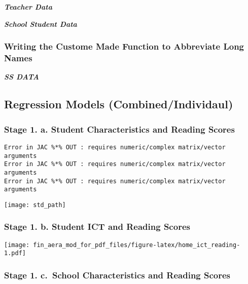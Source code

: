 \documentclass[
]{article}
\begin{document}
\textbf{\emph{Teacher Data}}

\textbf{\emph{School Student Data}}

\hypertarget{writing-the-custome-made-function-to-abbreviate-long-names}{%
\subsubsection{Writing the Custome Made Function to Abbreviate Long
Names}\label{writing-the-custome-made-function-to-abbreviate-long-names}}

\textbf{\emph{SS DATA}}

\hypertarget{regression-models-combinedindividaul}{%
\subsection{Regression Models
(Combined/Individaul)}\label{regression-models-combinedindividaul}}

\hypertarget{stage-1.-a.-student-characteristics-and-reading-scores}{%
\subsubsection{Stage 1. a. Student Characteristics and Reading
Scores}\label{stage-1.-a.-student-characteristics-and-reading-scores}}

\begin{verbatim}
Error in JAC %*% OUT : requires numeric/complex matrix/vector arguments
Error in JAC %*% OUT : requires numeric/complex matrix/vector arguments
Error in JAC %*% OUT : requires numeric/complex matrix/vector arguments
\end{verbatim}

\texttt{[image: std\_path]}

\hypertarget{stage-1.-b.-student-ict-and-reading-scores}{%
\subsubsection{Stage 1. b. Student ICT and Reading
Scores}\label{stage-1.-b.-student-ict-and-reading-scores}}

\texttt{[image: fin\_aera\_mod\_for\_pdf\_files/figure-latex/home\_ict\_reading-1.pdf]}

\hypertarget{stage-1.-c.-school-characteristics-and-reading-scores}{%
\subsubsection{Stage 1. c.~School Characteristics and Reading
Scores}\label{stage-1.-c.-school-characteristics-and-reading-scores}}
\end{document}
